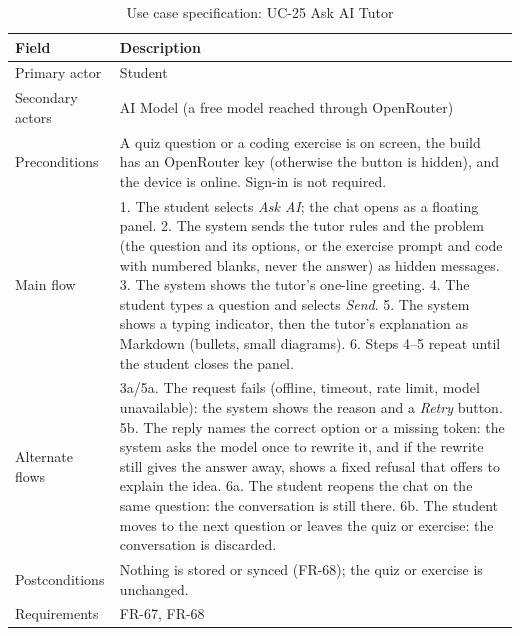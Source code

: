 \documentclass[12pt,letterpaper]{article}
\begin{document}
\begin{table}[H]
\centering
\caption{Use case specification: UC-25 Ask AI Tutor}
\label{tab:uc25}
\begin{tabularx}{\textwidth}{@{}L{3.0cm} Y@{}}
\toprule
\textbf{Field} & \textbf{Description} \\
\midrule
Primary actor & Student \\
Secondary actors & AI Model (a free model reached through OpenRouter) \\
Preconditions & A quiz question or a coding exercise is on screen, the build has an OpenRouter key (otherwise the button is hidden), and the device is online. Sign-in is not required. \\
Main flow & 1. The student selects \emph{Ask AI}; the chat opens as a floating panel. 2. The system sends the tutor rules and the problem (the question and its options, or the exercise prompt and code with numbered blanks, never the answer) as hidden messages. 3. The system shows the tutor's one-line greeting. 4. The student types a question and selects \emph{Send}. 5. The system shows a typing indicator, then the tutor's explanation as Markdown (bullets, small diagrams). 6. Steps 4--5 repeat until the student closes the panel. \\
Alternate flows & 3a/5a. The request fails (offline, timeout, rate limit, model unavailable): the system shows the reason and a \emph{Retry} button. 5b. The reply names the correct option or a missing token: the system asks the model once to rewrite it, and if the rewrite still gives the answer away, shows a fixed refusal that offers to explain the idea. 6a. The student reopens the chat on the same question: the conversation is still there. 6b. The student moves to the next question or leaves the quiz or exercise: the conversation is discarded. \\
Postconditions & Nothing is stored or synced (FR-68); the quiz or exercise is unchanged. \\
Requirements & FR-67, FR-68 \\
\bottomrule
\end{tabularx}
\end{table}
\end{document}
